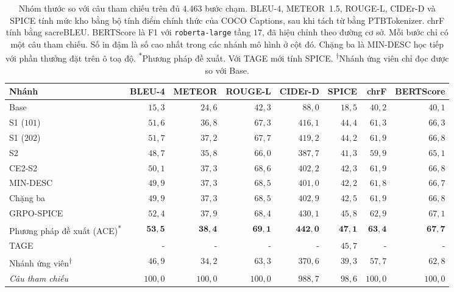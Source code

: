 \begin{table}[t]
\caption{Nhóm thước so với câu tham chiếu trên đủ $4.463$ bước chạm. BLEU-4, METEOR~1.5, ROUGE-L, CIDEr-D và SPICE tính mức kho bằng bộ tính điểm chính thức của COCO Captions, sau khi tách từ bằng PTBTokenizer. chrF tính bằng sacreBLEU. BERTScore là F1 với \texttt{roberta-large} tầng $17$, đã hiệu chỉnh theo đường cơ sở. Mỗi bước chỉ có một câu tham chiếu. Số in đậm là số cao nhất trong các nhánh mô hình ở cột đó. Chặng ba là MIN-DESC học tiếp với phần thưởng đặt trên ô toạ độ. \textsuperscript{$\ast$}Phương pháp đề xuất. Với TAGE mới tính SPICE. \textsuperscript{$\dagger$}Nhánh ứng viên chỉ đọc được so với Base.}
\label{tab:nhieuthuoc_vanban}
\centering\small
\renewcommand{\arraystretch}{1.2}
\setlength{\tabcolsep}{3.5pt}
\begin{tabular}{@{}lrrrrrrr@{}}
\toprule
Nhánh & BLEU-4 & METEOR & ROUGE-L & CIDEr-D & SPICE & chrF & BERTScore \\
\midrule
Base & $15{,}3$ & $24{,}6$ & $42{,}3$ & $88{,}0$ & $18{,}5$ & $40{,}2$ & $40{,}1$ \\
S1 ($101$) & $51{,}6$ & $36{,}8$ & $67{,}3$ & $416{,}1$ & $44{,}4$ & $61{,}3$ & $66{,}3$ \\
S1 ($202$) & $51{,}7$ & $37{,}2$ & $67{,}7$ & $419{,}2$ & $44{,}2$ & $61{,}9$ & $66{,}8$ \\
S2 & $48{,}7$ & $35{,}8$ & $66{,}0$ & $387{,}7$ & $41{,}3$ & $59{,}9$ & $65{,}1$ \\
CE2-S2 & $50{,}1$ & $37{,}3$ & $68{,}6$ & $402{,}2$ & $42{,}3$ & $61{,}9$ & $66{,}8$ \\
MIN-DESC & $49{,}9$ & $37{,}3$ & $68{,}5$ & $401{,}0$ & $42{,}2$ & $61{,}8$ & $66{,}7$ \\
Chặng ba & $49{,}9$ & $37{,}3$ & $68{,}5$ & $402{,}9$ & $42{,}5$ & $61{,}9$ & $66{,}8$ \\
GRPO-SPICE & $52{,}4$ & $37{,}9$ & $68{,}4$ & $430{,}1$ & $45{,}8$ & $62{,}9$ & $67{,}1$ \\
Phương pháp đề xuất (ACE)\textsuperscript{$\ast$} & $\mathbf{53{,}5}$ & $\mathbf{38{,}4}$ & $\mathbf{69{,}1}$ & $\mathbf{442{,}0}$ & $\mathbf{47{,}1}$ & $\mathbf{63{,}4}$ & $\mathbf{67{,}7}$ \\
TAGE & - & - & - & - & $45{,}7$ & - & - \\
Nhánh ứng viên\textsuperscript{$\dagger$} & $46{,}9$ & $34{,}2$ & $63{,}3$ & $370{,}6$ & $39{,}3$ & $57{,}7$ & $62{,}8$ \\
\midrule
\emph{Câu tham chiếu} & $100{,}0$ & $100{,}0$ & $100{,}0$ & $988{,}7$ & $98{,}6$ & $100{,}0$ & $100{,}0$ \\
\bottomrule
\end{tabular}
\end{table}

